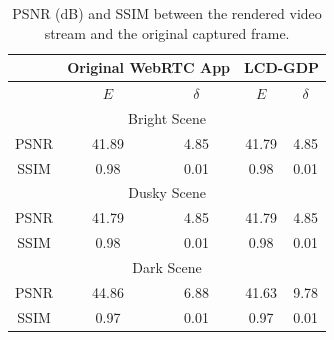 

\begin{table}[t]
	\small
	\centering
	\caption{PSNR (dB) and SSIM between the rendered video stream and the original captured frame.}
	\vspace{0.5em}
	\begin{tabular}{|c||c|c||c|c|}
		\hline
		& \multicolumn{2}{|c||}{Original WebRTC App} & \multicolumn{2}{|c|}{LCD-GDP} \\ \hline
		& $E$ & $\delta$ & $E$ & $\delta$ \\ \hline
		\multicolumn{5}{|c|}{Bright Scene} \\ \hline
		PSNR & 41.89 & 4.85 & 41.79 & 4.85 \\ \hline
		SSIM & 0.98 & 0.01  & 0.98 & 0.01 \\ \hline
		\multicolumn{5}{|c|}{Dusky Scene} \\ \hline
		PSNR & 41.79 & 4.85  & 41.79 & 4.85 \\ \hline
		SSIM & 0.98 & 0.01  & 0.98 & 0.01 \\ \hline
		\multicolumn{5}{|c|}{Dark Scene} \\ \hline
		PSNR & 44.86 & 6.88  & 41.63 & 9.78 \\ \hline
		SSIM & 0.97 & 0.01  & 0.97 & 0.01 \\ \hline
	\end{tabular}
	\label{tab:distortion}
\end{table}




